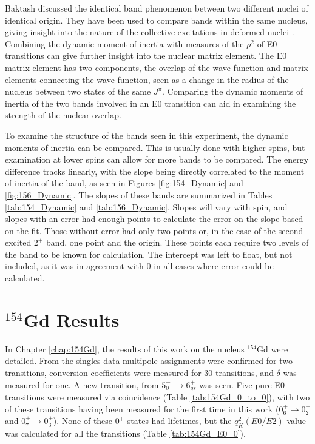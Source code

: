 Baktash discussed the identical band phenomenon between two different nuclei of identical origin. They have been used to compare bands within the same nucleus, giving insight into the nature of the collective excitations in deformed nuclei \citep{aprahamian18:_156gd}. Combining the dynamic moment of inertia with measures of the $\rho^2$ of E0 transitions can give further insight into the nuclear matrix element. The E0 matrix element has two components, the overlap of the wave function and matrix elements connecting the wave function, seen as a change in the radius of the nucleus between two states of the same $J^{\pi}$. Comparing the dynamic moments of inertia of the two bands involved in an E0 transition can aid in examining the strength of the nuclear overlap.

To examine the structure of the bands seen in this experiment, the dynamic moments of inertia can be compared. This is usually done with higher spins, but examination at lower spins can allow for more bands to be compared. The energy difference tracks linearly, with the slope being directly correlated to the moment of inertia of the band, as seen in Figures \ref{fig:154_Dynamic} and \ref{fig:156_Dynamic}. The slopes of these bands are summarized in Tables \ref{tab:154_Dynamic} and \ref{tab:156_Dynamic}. Slopes will vary with spin, and slopes with an error had enough points to calculate the error on the slope based on the fit. Those without error had only two points or, in the case of the second excited $2^+$ band, one point and the origin. These points each require two levels of the band to be known for calculation. The intercept was left to float, but not included, as it was in agreement with 0 in all cases where error could be calculated.

\section{$^{154}$Gd Results}
\label{sec:154_Discussion}
In Chapter \ref{chap:154Gd}, the results of this work on the nucleus $^{154}$Gd were detailed. From the singles data multipole assignments were confirmed for two transitions, conversion coefficients were measured for 30 transitions, and $\delta$ was measured for one. A new transition, from $5^-_{0^-}\rightarrow 6^+_{gs}$ was seen. Five pure E0 transitions were measured via coincidence (Table \ref{tab:154Gd_0_to_0}), with two of these transitions having been measured for the first time in this work ($0^+_6\rightarrow 0^+_2$ and $0^+_7\rightarrow 0^+_3$). None of these $0^+$ states had lifetimes, but the $q_K^2(E0/E2)$ value was calculated for all the transitions (Table \ref{tab:154Gd_E0_0}).

